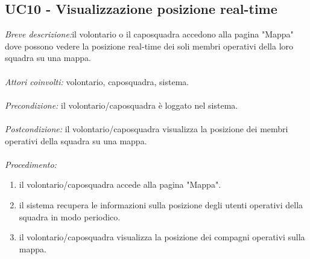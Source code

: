 \subsection{UC10 - Visualizzazione posizione real-time}
\textit{Breve descrizione:}il volontario o il caposquadra accedono alla pagina "Mappa" dove possono vedere la posizione real-time dei soli membri operativi della loro squadra su una mappa. 
\\
\\
\textit{Attori coinvolti:} volontario, caposquadra, sistema.
\\
\\
\textit{Precondizione:} il volontario/caposquadra è loggato nel sistema.
\\
\\
\textit{Postcondizione:} il volontario/caposquadra visualizza la posizione dei membri operativi della squadra su una mappa.
\\
\\
\textit{Procedimento:}
\begin{enumerate}
	\item il volontario/caposquadra accede alla pagina "Mappa".
	\item il sistema recupera le informazioni sulla posizione degli utenti operativi della squadra in modo periodico.
	\item il volontario/caposquadra visualizza la posizione dei compagni operativi sulla mappa.
\end{enumerate}
